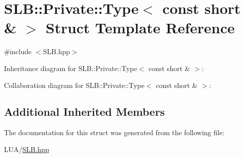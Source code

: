 \hypertarget{structSLB_1_1Private_1_1Type_3_01const_01short_01_6_01_4}{}\section{S\+LB\+:\+:Private\+:\+:Type$<$ const short \& $>$ Struct Template Reference}
\label{structSLB_1_1Private_1_1Type_3_01const_01short_01_6_01_4}


{\ttfamily \#include $<$S\+L\+B.\+hpp$>$}



Inheritance diagram for S\+LB\+:\+:Private\+:\+:Type$<$ const short \& $>$\+:


Collaboration diagram for S\+LB\+:\+:Private\+:\+:Type$<$ const short \& $>$\+:
\subsection*{Additional Inherited Members}


The documentation for this struct was generated from the following file\+:\begin{DoxyCompactItemize}
\item 
L\+U\+A/\hyperlink{SLB_8hpp}{S\+L\+B.\+hpp}\end{DoxyCompactItemize}
